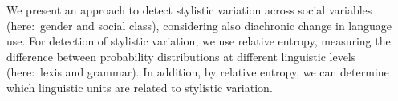 We present an approach to detect stylistic variation across social variables (here:\ gender and social class), considering also diachronic change in language use. For detection of stylistic variation, we use relative entropy, measuring the difference between probability distributions at different linguistic levels (here:\ lexis and grammar). In addition, by relative entropy, we can determine which linguistic units are related to stylistic variation.

